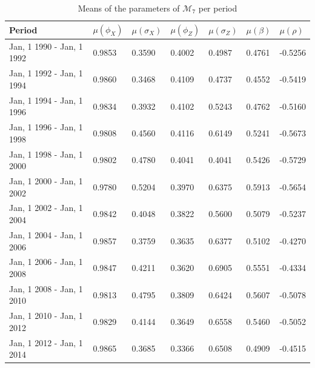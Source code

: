 \documentclass[11pt,a4,twosided,singlespacing,titlepagenumber=on]{scrreprt}
\numberwithin{equation}{chapter} %
\theoremstyle{remark}
\begin{document}
\renewcommand{\arraystretch}{0.9}%
\begin{table}[H]
\centering
\begin{tabular}{lllllll}
\hline
\multicolumn{1}{|l|}{Period} & \multicolumn{1}{|l|}{$\mu(\phi_X)$} & \multicolumn{1}{|l|}{$\mu(\sigma_X)$} & \multicolumn{1}{|l|}{$\mu(\phi_Z)$} & \multicolumn{1}{|l|}{$\mu(\sigma_Z)$} & \multicolumn{1}{|l|}{$\mu(\beta)$} & \multicolumn{1}{|l|}{$\mu(\rho)$} \\ \hline
Jan, 1 1990 - Jan, 1 1992 &  0.9853 & 0.3590 & 0.4002 & 0.4987 & 0.4761 & -0.5256 \\
Jan, 1 1992 - Jan, 1 1994 &  0.9860 & 0.3468 & 0.4109 & 0.4737 & 0.4552 & -0.5419 \\ 
Jan, 1 1994 - Jan, 1 1996 &  0.9834 & 0.3932 & 0.4102 & 0.5243 & 0.4762 & -0.5160 \\
Jan, 1 1996 - Jan, 1 1998 &  0.9808 & 0.4560 & 0.4116 & 0.6149 & 0.5241 & -0.5673 \\
Jan, 1 1998 - Jan, 1 2000 &  0.9802 & 0.4780 & 0.4041 & 0.4041 & 0.5426 & -0.5729 \\
Jan, 1 2000 - Jan, 1 2002 &  0.9780 & 0.5204 & 0.3970 & 0.6375 & 0.5913 & -0.5654 \\
Jan, 1 2002 - Jan, 1 2004 &  0.9842 & 0.4048 & 0.3822 & 0.5600 & 0.5079 & -0.5237 \\
Jan, 1 2004 - Jan, 1 2006 &  0.9857 & 0.3759 & 0.3635 & 0.6377 & 0.5102 & -0.4270 \\
Jan, 1 2006 - Jan, 1 2008 &  0.9847 & 0.4211 & 0.3620 & 0.6905 & 0.5551 & -0.4334 \\
Jan, 1 2008 - Jan, 1 2010 &  0.9813 & 0.4795 & 0.3809 & 0.6424 & 0.5607 & -0.5078 \\
Jan, 1 2010 - Jan, 1 2012 &  0.9829 & 0.4144 & 0.3649 & 0.6558 & 0.5460 & -0.5052\\
Jan, 1 2012 - Jan, 1 2014 &  0.9865 & 0.3685 & 0.3366 & 0.6508 & 0.4909 & -0.4515\\
\hline
\end{tabular}
\caption{Means of the parameters of $\mathcal{M}_7$ per period}
\label{tab:param_stats_1992_2014}
\end{table}
\end{document}

